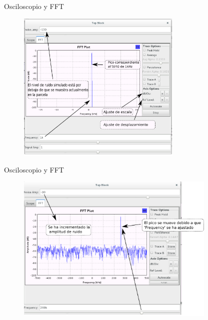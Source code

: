 \begin{frame}{Osciloscopio y FFT}
\begin{figure}[H]
\vspace{-3mm}
\centering
\includegraphics[width=0.7\textwidth]{lab2/pdf/lab2_9.pdf}
\end{figure}
\end{frame}

\begin{frame}{Osciloscopio y FFT}
\begin{figure}[H]
\vspace{-3mm}
\centering
\includegraphics[width=0.85\textwidth]{lab2/pdf/lab2_10.pdf}
\end{figure}
\end{frame}

